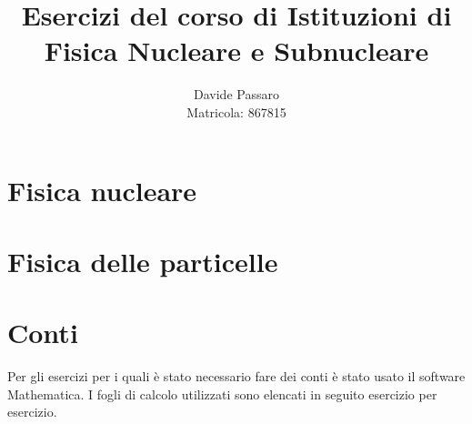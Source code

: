 \documentclass[10pt, a4paper]{article}
\title{Esercizi del corso di Istituzioni di Fisica Nucleare e Subnucleare}
\author{Davide Passaro \\ Matricola: 867815}
\date{}
\theoremstyle{plain}
\begin{document}
	\maketitle
	\section{Fisica nucleare}
		
		
		
		

	\section{Fisica delle particelle}
		
		
		
		

	\section{Conti}
		Per gli esercizi per i quali è stato necessario fare dei conti è stato usato il software Mathematica. I fogli di calcolo utilizzati sono elencati in seguito esercizio per esercizio.
		
		
		
		
		
		
\end{document}
